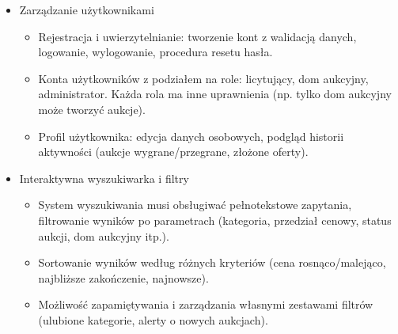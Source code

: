 \begin{itemize}
    \item Zarządzanie użytkownikami
          \begin{itemize}
              \item Rejestracja i uwierzytelnianie: tworzenie kont z walidacją danych, logowanie, wylogowanie, procedura resetu hasła.
              \item Konta użytkowników z podziałem na role: licytujący, dom aukcyjny, administrator. Każda rola ma inne uprawnienia (np. tylko dom aukcyjny może tworzyć aukcje).
              \item Profil użytkownika: edycja danych osobowych, podgląd historii aktywności (aukcje wygrane/przegrane, złożone oferty).
          \end{itemize}
    \item Interaktywna wyszukiwarka i filtry
          \begin{itemize}
              \item System wyszukiwania musi obsługiwać pełnotekstowe zapytania, filtrowanie wyników po parametrach (kategoria, przedział cenowy, status aukcji, dom aukcyjny itp.).
              \item Sortowanie wyników według różnych kryteriów (cena rosnąco/maleją\-co, najbliższe zakończenie, najnowsze).
              \item Możliwość zapamiętywania i zarządzania własnymi zestawami filtrów (ulubione kategorie, alerty o nowych aukcjach).
          \end{itemize}
\end{itemize}

